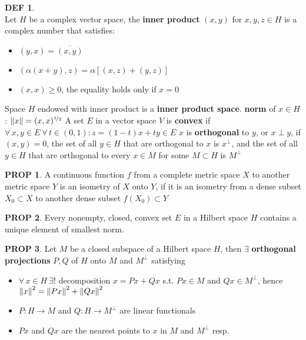 \documentclass[hidelinks,10pt]{article}
\theoremstyle{definition}
\newtheorem*{defin}{DEF}
\theoremstyle{dotles}
\theoremstyle{dotless}
\newtheorem{proposition}{PROP}[section]
\theoremstyle{remark}
\begin{document}
\begin{defin}~\\
Let $H$ be a complex vector space, the \textbf{inner product} $(x,y)$ for $x,y,z\in H$ is a complex number that satisfies:\begin{itemize}
    \item $(y,x)=\overline{(x,y)}$
    \item $(\alpha( x+y),z)=\alpha[(x,z)+(y,z)]$
    \item $(x,x)\geq0$, the equality holds only if $x=0$
\end{itemize}
Space $H$ endowed with inner product is a \textbf{inner product space}.\bigbreak
\textbf{norm} of $x\in H$: $\norm{x}=(x,x)^{\nicefrac{1}{2}}$\bigbreak
A set $E$ in a vector space $V$ is \textbf{convex} if $\forall\,x,y\in E\ \forall\,t\in(0,1):z=(1-t)x+ty\in E$\newline
$x$ is \textbf{orthogonal} to $y$, or $x\perp y$, if $(x,y)=0$, the set of all $y\in H$ that are orthogonal to $x$ is $x^\perp$, and the set of all $y\in H$ that are orthogonal to every $x\in M$ for some $M\subset H$ is $M^\perp$
\end{defin}

\begin{proposition}
A continuous function $f$ from a complete metric space $X$ to another metric space $Y$ is an isometry of $X$ onto $Y$, if it is an isometry from a dense subset $X_0\subset X$ to another dense subset $f(X_0)\subset Y$
\end{proposition}

\begin{proposition}
Every nonempty, closed, convex set $E$ in a Hilbert space $H$ contains a unique element of smallest norm. 
\end{proposition}

\begin{proposition}
Let $M$ be a closed subspace of a Hilbert space $H$, then $\exists$ \textbf{orthogonal projections} $P,Q$ of $H$ onto $M$ and $M^\perp$ satisfying\begin{itemize}
    \item $\forall\,x\in H\ \exists!$ decomposition $x=Px+Qx$ s.t. $Px\in M$ and $Qx\in M^\perp$, hence $\norm{x}^2=\norm{Px}^2+\norm{Qx}^2$
    \item $P:H\to M$ and $Q:H\to M^\perp$ are linear functionals
    \item $Px$ and $Qx$ are the nearest points to $x$ in $M$ and $M^\perp$ resp.
\end{itemize}
\end{proposition}
\end{document}
